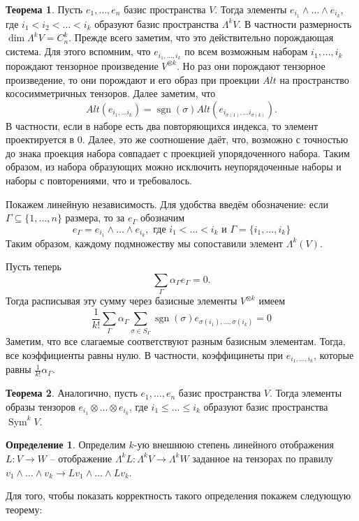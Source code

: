 \documentclass[10pt,a4paper,oneside]{book}
\theoremstyle{definition}
\newtheorem*{defn}{{\color{yellow!30!red} Определение}}
\newtheorem{thm}{{\color{red!40!black} Теорема}}
\newcommand{\Sym}{\operatorname{Sym}}
\newcommand{\sgn}{\operatorname{sgn}}
\def\thrm{\begin{thm}}
\def\ethrm{\end{thm}}
\def\dfn{\begin{defn}}
\def\edfn{\end{defn}}
\begin{document}
\thrm Пусть $e_1,\dots, e_n$ базис пространства $V$. Тогда элементы $e_{i_1}\wedge \dots \wedge e_{i_k}$, где $i_1<i_2< \dots < i_k$ образуют базис пространства $\Lambda^k V$. В частности размерность $\dim \Lambda^k V = C^k_n$.
\proof Прежде всего заметим, что это действительно порождающая система. Для этого вспомним, что $e_{i_1,\dots,i_k}$ по всем возможным наборам $i_1,\dots,i_k$ порождают тензорное произведение $V^{\otimes k}$. Но раз они порождают тензорное произведение, то они порождают и его образ при проекции $Alt$ на пространство кососимметричных тензоров. Далее заметим, что $$Alt(e_{i_1,\dots i_k})= \sgn(\sigma) Alt(e_{i_{\sigma(1)},\dots i_{\sigma(k)}}).$$
В частности, если в наборе есть два повторяющихся индекса, то элемент проектируется в 0. Далее, это же соотношение даёт, что, возможно с точностью до знака проекция набора совпадает с проекцией упорядоченного набора. Таким образом, из набора образующих можно исключить неупорядоченные наборы и наборы с повторениями, что и требовалось.

Покажем линейную независимость. Для удобства введём обозначение: если $\Gamma\subseteq \{1,\dots,n\}$ размера, то за $e_{\Gamma}$ обозначим 
$$e_{\Gamma}= e_{i_1}\wedge \dots \wedge e_{i_k}, \text{ где } i_1<\dots<i_k \text{ и } \Gamma=\{i_1,\dots,i_k\}$$
Таким образом, каждому подмножеству мы сопоставили элемент $\Lambda^k(V)$. 

Пусть теперь 
$$\sum_{\Gamma} \alpha_{\Gamma} e_{\Gamma}=0.$$
Тогда расписывая эту сумму через базисные элементы $V^{\otimes k}$ имеем
$$\frac{1}{k!}\sum_{\Gamma} \alpha_{\Gamma} \sum_{\sigma \in S_{\Gamma}} \sgn(\sigma) e_{\sigma(i_1),\dots,\sigma(i_k)} =0 $$
Заметим, что все слагаемые соответствуют разным базисным элементам. Тогда, все коэффициенты равны нулю. В частности, коэффицинеты при $ e_{i_1, \dots, i_k}$, которые равны $\frac{1}{k!}\alpha_{\Gamma}$. 

\endproof
\ethrm

\thrm Аналогично, пусть $e_1,\dots, e_n$ базис пространства $V$. Тогда элементы образы тензоров $e_{i_1}\otimes \dots \otimes e_{i_k}$, где $i_1\leq \dots \leq i_k$ образуют базис пространства $\Sym^k V$.
\ethrm

\dfn Определим $k$-ую внешнюю степень линейного отображения $L\colon V \to W$ -- отображение $\Lambda^{k} L  \colon \Lambda^k V \to \Lambda^k W$ заданное на тензорах по правилу $v_1\wedge \dots \wedge v_k \to L v_1 \wedge \dots \wedge L v_k$. 
\edfn

Для того, чтобы показать корректность такого определения покажем следующую теорему:
\end{document}
